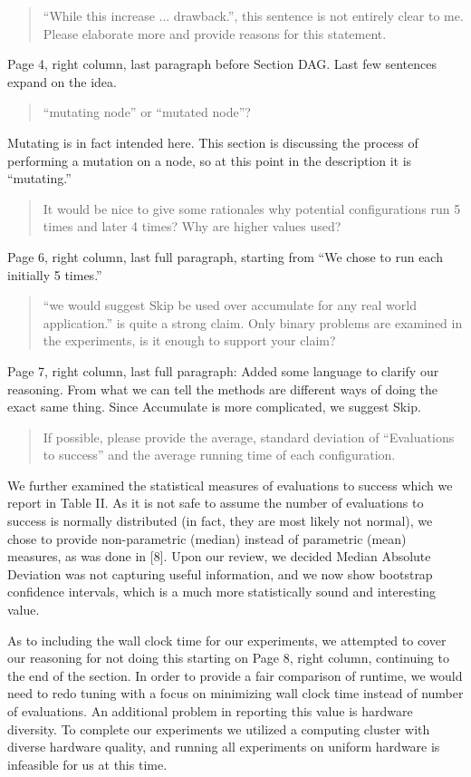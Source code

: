 \documentclass{letter}
\begin{document}
\begin{letter}{}
\begin{quote}``While this increase ... drawback.'', this sentence is not entirely clear to me. Please elaborate more and provide reasons for this statement.\end{quote}
Page 4, right column, last paragraph before Section DAG.  Last few sentences expand on the idea.

\begin{quote}``mutating node'' or ``mutated node''?\end{quote}
Mutating is in fact intended here.  This section is discussing the process of performing
a mutation on a node, so at this point in the description it is ``mutating.''

\begin{quote}It would be nice to give some rationales why potential configurations run 5 times and later 4 times? Why are higher values used?\end{quote}
Page 6, right column, last full paragraph, starting from ``We chose to run each initially 5 times.''

\begin{quote}``we would suggest Skip be used over accumulate for any real world application.'' is quite a strong claim. Only binary problems are examined in the experiments, is it enough to support your claim?\end{quote}
Page 7, right column, last full paragraph: Added some language to clarify our reasoning.  From what we can tell
the methods are different ways of doing the exact same thing.  Since Accumulate is more complicated, we suggest Skip.

\begin{quote}If possible, please provide the average, standard deviation of ``Evaluations to success'' and the average running time of each configuration.\end{quote}
We further examined the statistical measures
of evaluations to success which we report in Table II.  As it is not safe to assume the number
of evaluations to success is normally distributed (in fact, they are most likely not normal),
we chose to provide non-parametric (median) instead of parametric (mean) measures,
as was done in [8].  Upon our review, we decided Median Absolute Deviation was not
capturing useful information, and we now show bootstrap confidence intervals, which is a much
more statistically sound and interesting value.

As to including the wall clock time for our experiments, we attempted to cover our
reasoning for not doing this starting on Page 8, right column, continuing to the end of the section.
In order to provide a fair comparison of runtime, we would need to redo tuning
with a focus on minimizing wall clock time instead of number of evaluations.
An additional
problem in reporting this value is hardware diversity.  To complete our experiments
we utilized a computing cluster with diverse hardware quality, and running all experiments
on uniform hardware is infeasible for us at this time.



\end{letter}
\end{document}
